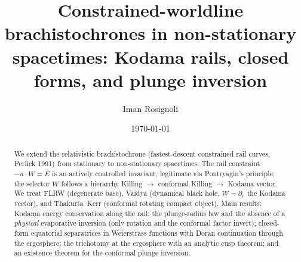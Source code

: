 \documentclass[
    aps, prd, twocolumn, superscriptaddress,
    showpacs, nofootinbib, floatfix
]{revtex4-2}
\newcommand{\Ehat}{\hat E}
\begin{document}
\title{Constrained-worldline brachistochrones in non-stationary
spacetimes: Kodama rails, closed forms, and plunge inversion}

\author{Iman Rosignoli}

\date{\today}

\begin{abstract}
We extend the relativistic brachistochrone (fastest-descent
constrained rail curves, Perlick 1991) from stationary to non-stationary
spacetimes. The rail constraint $-u\cdot W=\Ehat$ is an actively controlled
invariant, legitimate via Pontryagin's principle; the selector $W$ follows a
hierarchy Killing $\to$ conformal Killing $\to$ Kodama vector. We treat FLRW
(degenerate base), Vaidya (dynamical black hole, $W=\partial_v$ the Kodama
vector), and Thakurta--Kerr (conformal rotating compact object). Main results:
Kodama energy conservation along the rail; the plunge-radius law and the
absence of a \emph{physical} evaporative inversion (only rotation and the
conformal factor invert); closed-form equatorial separatrices in Weierstrass
functions with Doran continuation through the ergosphere; the trichotomy at
the ergosphere with an analytic cusp theorem; and an existence theorem for the
conformal plunge inversion.
\end{abstract}

\maketitle

{\hypersetup{linkcolor=black}\tableofcontents}


\end{document}
